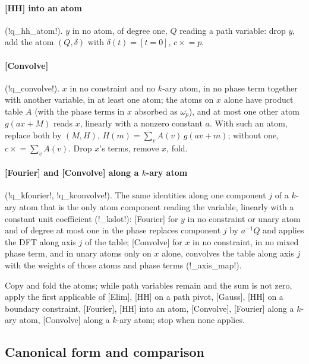 \paragraph{[HH] into an atom} (\code!q_hh_atom!). $y$ in no atom, of degree one, $Q$ reading a path variable: drop $y$, add the atom $(Q,\delta)$ with $\delta(t)=[t=0]$, $c\mathrel{\times}=p$.

\paragraph{[Convolve]} (\code!q_convolve!). $x$ in no constraint and no $k$-ary atom, in no phase term together with another variable, in at least one atom; the atoms on $x$ alone have product table $A$ (with the phase terms in $x$ absorbed as $\omega_p^{\cdot}$), and at most one other atom $g(ax+M)$ reads $x$, linearly with a nonzero constant $a$. With such an atom, replace both by $(M,H)$, $H(m)=\sum_vA(v)\,g(av+m)$; without one, $c\mathrel{\times}=\sum_vA(v)$. Drop $x$'s terms, remove $x$, fold.

\paragraph{[Fourier] and [Convolve] along a $k$-ary atom} (\code!q_kfourier!, \code!q_kconvolve!). The same identities along one component $j$ of a $k$-ary atom that is the only atom component reading the variable, linearly with a constant unit coefficient (\py!_kslot!): [Fourier] for $y$ in no constraint or unary atom and of degree at most one in the phase replaces component $j$ by $a^{-1}Q$ and applies the DFT along axis $j$ of the table; [Convolve] for $x$ in no constraint, in no mixed phase term, and in unary atoms only on $x$ alone, convolves the table along axis $j$ with the weights of those atoms and phase terms (\py!_axis_map!).

\begin{algorithm}\label{alg:algebra-reduce-qudit}
Copy and fold the atoms; while path variables remain and the sum is not zero, apply the first applicable of [Elim], [HH] on a path pivot, [Gauss], [HH] on a boundary constraint, [Fourier], [HH] into an atom, [Convolve], [Fourier] along a $k$-ary atom, [Convolve] along a $k$-ary atom; stop when none applies.
\end{algorithm}

\subsection{Canonical form and comparison}

